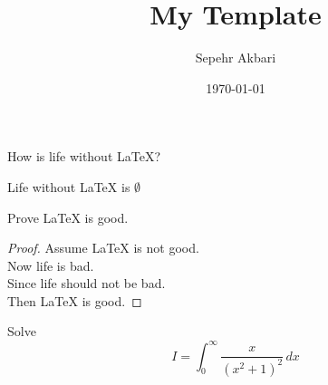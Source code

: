 \documentclass{my-cls}
\title{My Template}
\author{Sepehr Akbari}
\date{\today}
\begin{document}
\maketitle
\thispagestyle{firststyle}


\begin{problem}[1]
    How is life without LaTeX?
\end{problem}
\begin{solution}
    Life without LaTeX is \(\emptyset\)
\end{solution}

\bigskip

\begin{problem}[2]
    Prove LaTeX is good.    
\end{problem}
\begin{solution}
    \begin{proof}
        Assume LaTeX is not good.\\
        Now life is bad. \\
        Since life should not be bad.\\
        Then LaTeX is good.
    \end{proof}
\end{solution}

\bigskip

\begin{problem}[5]
    Solve \[I = \int_0^\infty \frac{x}{(x^2+1)^2}\,dx\]
\end{problem}
\end{document}
